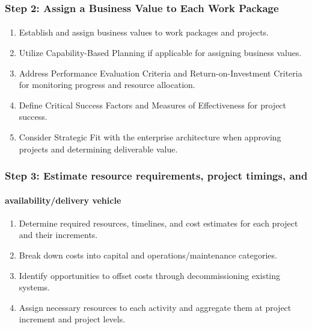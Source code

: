 \documentclass[aspectratio=169, table]{beamer}
\begin{document}
	\begin{frame}
		\frametitle{Step 2: Assign a Business Value to Each Work Package}
		\framesubtitle{\hspace{1cm}}
		\vspace{20pt}
			\begin{enumerate}
				\item Establish and assign business values to work packages and projects.
				\item Utilize Capability-Based Planning if applicable for assigning business values.
				\item Address Performance Evaluation Criteria and Return-on-Investment Criteria for monitoring progress and resource allocation.
				\item Define Critical Success Factors and Measures of Effectiveness for project success.
				\item Consider Strategic Fit with the enterprise architecture when approving projects and determining deliverable value.
			\end{enumerate}
	\end{frame}

	\begin{frame}
	\frametitle{Step 3: Estimate resource requirements, project timings, and}
	\framesubtitle{availability/delivery vehicle}
	\vspace{20pt}
		\begin{enumerate}
			\item Determine required resources, timelines, and cost estimates for each project and their increments.
			\item Break down costs into capital and operations/maintenance categories.
			\item Identify opportunities to offset costs through decommissioning existing systems.
			\item Assign necessary resources to each activity and aggregate them at project increment and project levels.
		\end{enumerate}
\end{frame}
\end{document}
